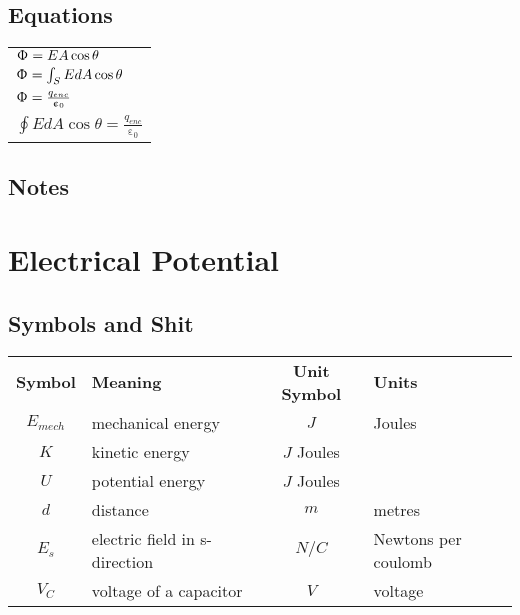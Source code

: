 \documentclass[12pt, letterpaper, twoside]{article}
\begin{document}
  \subsection*{Equations}
    \begin{tabular}{l}
      $\Upphi = EA \cos \theta$\\
      $\Upphi = \int_S EdA \cos \theta$\\
      $\Upphi = \frac{q_{enc}}{\upepsilon_0}$\\
      $\oint EdA \cos \theta = \frac{q_{enc}}{\upepsilon_0}$\\
    \end{tabular}
  
  \subsection*{Notes}
  
  
 
\section{Electrical Potential}
  \subsection*{Symbols and Shit}
    \begin{tabular}{c l c l}
  	  \textbf{Symbol} & \textbf{Meaning} & \textbf{Unit Symbol} & \textbf{Units}\\
  	  $E_{mech}$ & mechanical energy & $J$ & Joules\\
  	  $K$ & kinetic energy & $J$ Joules\\
  	  $U$ & potential energy & $J$ Joules\\
  	  $d$ & distance & $m$ & metres\\
  	  $E_s$ & electric field in s-direction & $N/C$ & Newtons per coulomb\\
  	  $V_C$ & voltage of a capacitor & $V$ & voltage\\
  	  
  	  
    \end{tabular}
  
\end{document}
